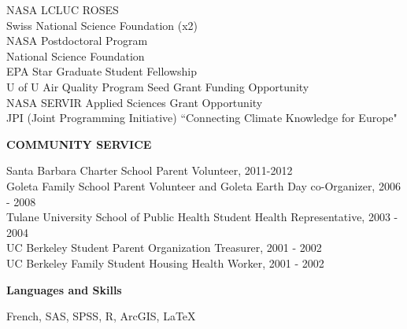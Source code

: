 \documentclass[11pt]{article} %
\begin{document}
\noindent
NASA LCLUC ROSES\\
Swiss National Science Foundation (x2)\\
NASA Postdoctoral Program\\
National Science Foundation\\
EPA Star Graduate Student Fellowship\\
U of U Air Quality Program Seed Grant Funding Opportunity\\
NASA SERVIR Applied Sciences Grant Opportunity\\
JPI (Joint Programming Initiative) ``Connecting Climate Knowledge for Europe"\\






\vspace{.5cm}

\noindent
{\large \textbf{COMMUNITY SERVICE}}
\vspace{.5cm}


\noindent
Santa Barbara Charter School Parent Volunteer, 2011-2012\\
Goleta Family School Parent Volunteer and Goleta Earth Day co-Organizer, 2006 - 2008\\
Tulane University School of Public Health Student Health Representative, 2003 - 2004\\
UC Berkeley Student Parent Organization Treasurer, 2001 - 2002\\
UC Berkeley Family Student Housing Health Worker, 2001 - 2002\\

\vspace{.5cm}

\noindent
\textbf {Languages and Skills}

\noindent
French, 
SAS, SPSS, R, ArcGIS, \LaTeX\,  
\end{document}
